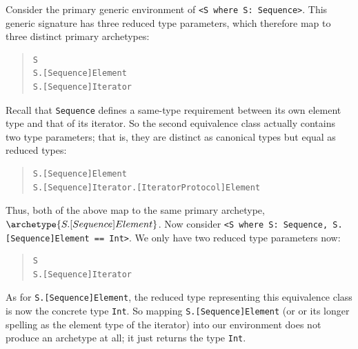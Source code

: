 \documentclass[../generics]{subfiles}
\begin{document}
\begin{example}
%
Consider the primary generic environment of \verb|<S where S: Sequence>|. This generic signature has three reduced type parameters, which therefore map to three distinct primary archetypes:
\begin{quote}
\begin{verbatim}
S
S.[Sequence]Element
S.[Sequence]Iterator
\end{verbatim}
\end{quote}
Recall that \texttt{Sequence} defines a same-type requirement between its own element type and that of its iterator. So the second equivalence class actually contains two type parameters; that is, they are distinct as canonical types but equal as reduced types:
\begin{quote}
\begin{verbatim}
S.[Sequence]Element
S.[Sequence]Iterator.[IteratorProtocol]Element
\end{verbatim}
\end{quote}
Thus, both of the above map to the same primary archetype, $\archetype{S.[Sequence]Element}$.
Now consider \verb|<S where S: Sequence, S.[Sequence]Element == Int>|. We only have two reduced type parameters now:
\begin{quote}
\begin{verbatim}
S
S.[Sequence]Iterator
\end{verbatim}
\end{quote}
As for \texttt{S.[Sequence]Element}, the reduced type representing this equivalence class is now the concrete type \texttt{Int}. So mapping \texttt{S.[Sequence]Element} (or or its longer spelling as the element type of the iterator) into our environment does not produce an archetype at all;  it just returns the type \texttt{Int}.
\end{example}
\end{document}

